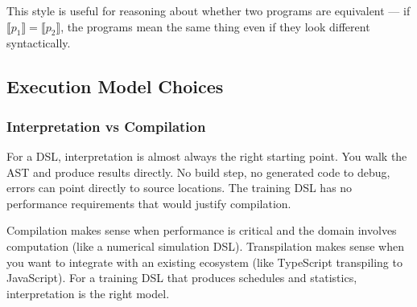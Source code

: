 This style is useful for reasoning about whether two programs are equivalent --- if
$\llbracket p_1 \rrbracket = \llbracket p_2 \rrbracket$, the programs mean the same thing
even if they look different syntactically.

\subsection{Execution Model Choices}

\subsubsection{Interpretation vs Compilation}

For a DSL, interpretation is almost always the right starting point. You walk the AST
and produce results directly. No build step, no generated code to debug, errors can point
directly to source locations. The training DSL has no performance requirements that would
justify compilation.

\begin{center}
\end{center}

Compilation makes sense when performance is critical and the domain involves computation
(like a numerical simulation DSL). Transpilation makes sense when you want to integrate
with an existing ecosystem (like TypeScript transpiling to JavaScript). For a training
DSL that produces schedules and statistics, interpretation is the right model.

